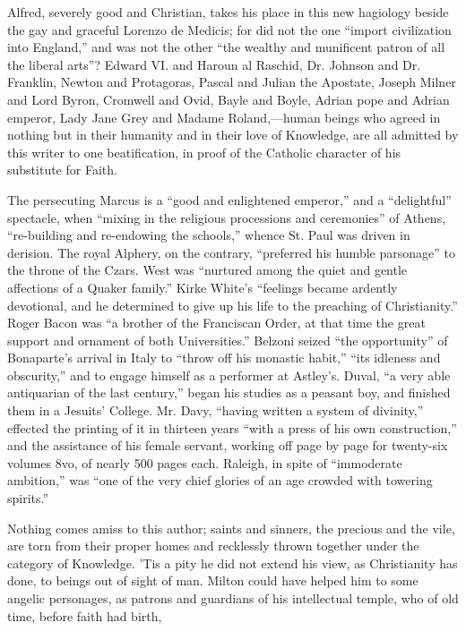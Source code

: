 Alfred, severely good and Christian, takes his place in this
new hagiology beside the gay and graceful Lorenzo de Medicis; for did
not the one ``import civilization into England,'' and was not
the other ``the wealthy and munificent patron of all the liberal
arts''? Edward VI. and Haroun al Raschid, Dr. Johnson and Dr.
Franklin, Newton and Protagoras, Pascal and Julian the Apostate,
Joseph Milner and Lord Byron, Cromwell and Ovid, Bayle and Boyle,
Adrian pope and Adrian emperor, Lady Jane Grey and Madame Roland,—human
beings who agreed in nothing but in their humanity and in their love
of Knowledge, are all admitted by this writer to one beatification, in
proof of the Catholic character of his substitute for Faith.

The persecuting Marcus is a ``good and enlightened
emperor,'' and a ``delightful'' spectacle, when
``mixing in the religious processions and ceremonies'' of
Athens, ``re-building and re-endowing the schools,'' whence
St. Paul was driven in derision. The royal Alphery, on the contrary,
``preferred his humble parsonage'' to the throne of the Czars.
West was ``nurtured among the quiet and gentle affections of a
Quaker family.'' Kirke White's ``feelings became ardently
devotional, and he determined to give up his life to the preaching of
Christianity.'' Roger Bacon was ``a brother of the Franciscan
Order, at that time the great support and ornament of both
Universities.'' Belzoni seized ``the opportunity'' of
Bonaparte's arrival in Italy to ``throw off his monastic
habit,'' ``its idleness and obscurity,'' and to engage
himself as a performer at Astley's. Duval, ``a very able
antiquarian of the last century,'' began his studies as a peasant
boy, and finished them in a Jesuits' College. Mr. Davy, ``having
written a system of divinity,'' effected the printing of it in
thirteen years ``with a press of his own construction,'' and
the assistance of his female servant, working off page by page
for twenty-six volumes 8vo, of nearly 500 pages each. Raleigh, in
spite of ``immoderate ambition,'' was ``one of the very
chief glories of an age crowded with towering spirits.''

Nothing comes amiss to this author; saints and sinners, the
precious and the vile, are torn from their proper homes and recklessly
thrown together under the category of Knowledge. 'Tis a pity he did
not extend his view, as Christianity has done, to beings out of sight
of man. Milton could have helped him to some angelic personages, as
patrons and guardians of his intellectual temple, who of old time,
before faith had birth,

